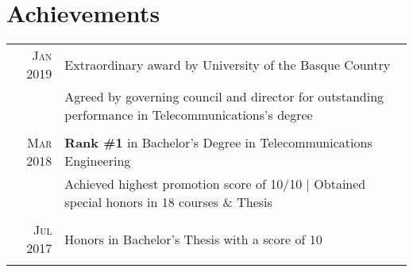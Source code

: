 \documentclass[a4paper,10pt]{article}
\begin{document}
\section{Achievements}
\begin{tabular}{rp{13.6cm}}
\textsc{Jan} 2019 & Extraordinary award by University of the Basque Country \\%
&\footnotesize{Agreed by governing council and director for outstanding performance in Telecommunications's degree} \\\vspace{-0.05in}&\\

\textsc{Mar} 2018 & \textbf{Rank \#1} in Bachelor's Degree in Telecommunications Engineering \\%
&\footnotesize{Achieved highest promotion score of 10/10 | Obtained special honors in 18 courses \& Thesis} \\\vspace{-0.05in}&\\

\textsc{Jul} 2017 & Honors in Bachelor's Thesis with a score of 10 \\%
\vspace{-0.05in}&\\


\end{tabular}
\end{document}
